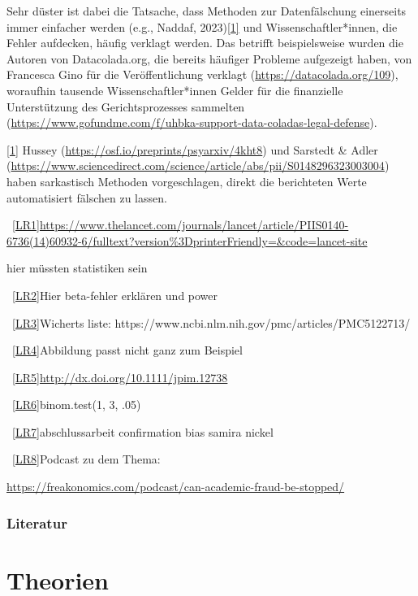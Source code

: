 \documentclass[
  letterpaper,
  DIV=11,
  numbers=noendperiod]{scrreprt}
\begin{document}
Sehr düster ist dabei die Tatsache, dass Methoden zur Datenfälschung
einerseits immer einfacher werden (e.g., Naddaf,
2023)\hyperref[_ftn1]{{[}1{]}} und Wissenschaftler*innen, die Fehler
aufdecken, häufig verklagt werden. Das betrifft beispielsweise wurden
die Autoren von Datacolada.org, die bereits häufiger Probleme aufgezeigt
haben, von Francesca Gino für die Veröffentlichung verklagt
(\url{https://datacolada.org/109}), woraufhin tausende
Wissenschaftler*innen Gelder für die finanzielle Unterstützung des
Gerichtsprozesses sammelten
(\url{https://www.gofundme.com/f/uhbka-support-data-coladas-legal-defense}).

\hyperref[_ftnref1]{{[}1{]}} Hussey
(\url{https://osf.io/preprints/psyarxiv/4kht8}) und Sarstedt \& Adler
(\url{https://www.sciencedirect.com/science/article/abs/pii/S0148296323003004})
haben sarkastisch Methoden vorgeschlagen, direkt die berichteten Werte
automatisiert fälschen zu lassen.

~\hyperref[_msoanchor_1]{{[}LR1{]}}\url{https://www.thelancet.com/journals/lancet/article/PIIS0140-6736(14)60932-6/fulltext?version\%3DprinterFriendly=&code=lancet-site}

hier müssten statistiken sein

~\hyperref[_msoanchor_2]{{[}LR2{]}}Hier beta-fehler erklären und power

~\hyperref[_msoanchor_3]{{[}LR3{]}}Wicherts liste:
https://www.ncbi.nlm.nih.gov/pmc/articles/PMC5122713/

~\hyperref[_msoanchor_4]{{[}LR4{]}}Abbildung passt nicht ganz zum
Beispiel

~\hyperref[_msoanchor_5]{{[}LR5{]}}\url{http://dx.doi.org/10.1111/jpim.12738}

~\hyperref[_msoanchor_6]{{[}LR6{]}}binom.test(1, 3, .05)

~\hyperref[_msoanchor_7]{{[}LR7{]}}abschlussarbeit confirmation bias
samira nickel

~\hyperref[_msoanchor_8]{{[}LR8{]}}Podcast zu dem Thema:

\url{https://freakonomics.com/podcast/can-academic-fraud-be-stopped/}

\subsection{Literatur}\label{literatur-8}

\chapter{Theorien}\label{theorien}
\end{document}
